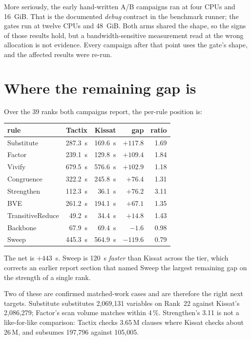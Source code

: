 \documentclass[11pt]{article}
\begin{document}
More seriously, the early hand-written A/B campaigns ran at four CPUs and
16~GiB. That is the documented \emph{debug} contract in the benchmark runner;
the gates run at twelve CPUs and 48~GiB. Both arms shared the shape, so the
signs of those results hold, but a bandwidth-sensitive measurement read at the
wrong allocation is not evidence. Every campaign after that point uses the
gate's shape, and the affected results were re-run.

\section{Where the remaining gap is}

Over the 39 ranks both campaigns report, the per-rule position is:

\begin{center}
\begin{tabular}{lrrrr}
\toprule
rule & Tactix & Kissat & gap & ratio \\
\midrule
Substitute        & 287.3~s & 169.6~s & $+117.8$ & 1.69 \\
Factor            & 239.1~s & 129.8~s & $+109.4$ & 1.84 \\
Vivify            & 679.5~s & 576.6~s & $+102.9$ & 1.18 \\
Congruence        & 322.2~s & 245.8~s & $+76.4$  & 1.31 \\
Strengthen        & 112.3~s & 36.1~s  & $+76.2$  & 3.11 \\
BVE               & 261.2~s & 194.1~s & $+67.1$  & 1.35 \\
TransitiveReduce  & 49.2~s  & 34.4~s  & $+14.8$  & 1.43 \\
Backbone          & 67.9~s  & 69.4~s  & $-1.6$   & 0.98 \\
Sweep             & 445.3~s & 564.9~s & $-119.6$ & 0.79 \\
\bottomrule
\end{tabular}
\end{center}

The net is $+443$~s. Sweep is 120~s \emph{faster} than Kissat across the tier,
which corrects an earlier report section that named Sweep the largest remaining
gap on the strength of a single rank.

Two of these are confirmed matched-work cases and are therefore the right next
targets. Substitute substitutes 2{,}069{,}131 variables on Rank~22 against
Kissat's 2{,}086{,}279; Factor's scan volume matches within 4\,\%. Strengthen's
3.11 is not a like-for-like comparison: Tactix checks 3.65\,M clauses where
Kissat checks about 26\,M, and subsumes 197{,}796 against 105{,}005.
\end{document}
